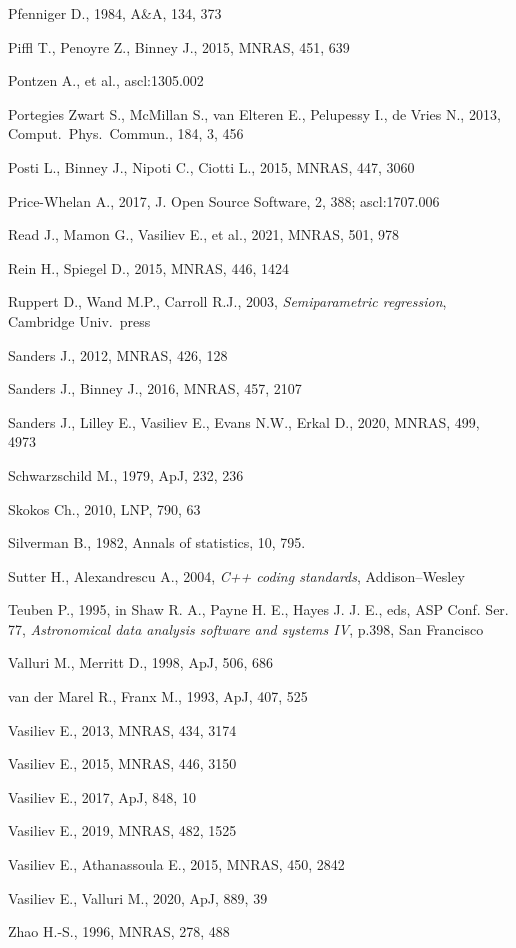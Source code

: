 \documentclass[12pt]{article}
\begin{document}
\begin{thebibliography}{99}
Pfenniger D., 1984, A\&A, 134, 373

Piffl T., Penoyre Z., Binney J., 2015, MNRAS, 451, 639

Pontzen A., et al., ascl:1305.002

Portegies Zwart S., McMillan S., van Elteren E., Pelupessy I., de Vries N., 2013, Comput.\ Phys.\ Commun., 184, 3, 456

Posti L., Binney J., Nipoti C., Ciotti L., 2015, MNRAS, 447, 3060

Price-Whelan A., 2017, J. Open Source Software, 2, 388; ascl:1707.006

Read J., Mamon G., Vasiliev E., et al., 2021, MNRAS, 501, 978

Rein H., Spiegel D., 2015, MNRAS, 446, 1424

Ruppert D., Wand M.P., Carroll R.J., 2003, \textsl{Semiparametric regression}, Cambridge Univ.\ press

Sanders J., 2012, MNRAS, 426, 128

Sanders J., Binney J., 2016, MNRAS, 457, 2107

Sanders J., Lilley E., Vasiliev E., Evans N.W., Erkal D., 2020, MNRAS, 499, 4973

Schwarzschild M., 1979, ApJ, 232, 236

Skokos Ch., 2010, LNP, 790, 63

Silverman B., 1982, Annals of statistics, 10, 795.

Sutter H., Alexandrescu A., 2004, \textsl{C++ coding standards}, Addison--Wesley

Teuben P., 1995, in Shaw R. A., Payne H. E., Hayes J. J. E., eds, ASP Conf. Ser. 77,
\textsl{Astronomical data analysis software and systems IV}, p.398, San Francisco

Valluri M., Merritt D., 1998, ApJ, 506, 686

van der Marel R., Franx M., 1993, ApJ, 407, 525

Vasiliev E., 2013, MNRAS, 434, 3174

Vasiliev E., 2015, MNRAS, 446, 3150

Vasiliev E., 2017, ApJ, 848, 10

Vasiliev E., 2019, MNRAS, 482, 1525

Vasiliev E., Athanassoula E., 2015, MNRAS, 450, 2842

Vasiliev E., Valluri M., 2020, ApJ, 889, 39

Zhao H.-S., 1996, MNRAS, 278, 488

\end{thebibliography}
\end{document}
